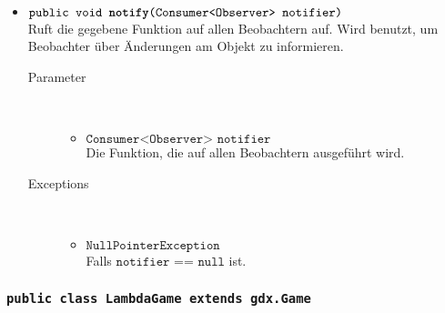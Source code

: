 \begin{description}
\begin{itemize}
		\item $\texttt{public void \textbf{notify}(Consumer<Observer> notifier)}$ \\ Ruft die gegebene Funktion auf allen Beobachtern auf. Wird benutzt, um Beobachter über Änderungen am Objekt zu informieren.
		\begin{description}
			\item[Parameter] \hfill \\
			\vspace{-.8cm}
			\begin{itemize}
				\item $\texttt{Consumer<Observer> notifier}$ \\ Die Funktion, die auf allen Beobachtern ausgeführt wird.
			\end{itemize}
			\item[Exceptions] \hfill \\
			\vspace{-.8cm}
			\begin{itemize}
				\item $\texttt{NullPointerException}$ \\ Falls $\texttt{notifier == null}$ ist.
			\end{itemize}
		\end{description}
	\end{itemize}
\end{description}

\subsubsection{\normalfont \texttt{public class \textbf{LambdaGame} extends gdx.Game}}

